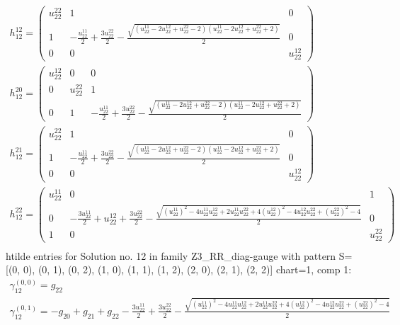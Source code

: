 \documentclass[a4paper, 11pt, twoside, onecolumn]{article}
\begin{document}
\begin{landscape}
\begin{gather*}
	 h_12^{12}=\begin{pmatrix}u^{22}_{22} & 1 & 0\\1 & - \frac{u^{11}_{22}}{2} + \frac{3 u^{22}_{22}}{2} - \frac{\sqrt{\left(u^{11}_{22} - 2 u^{12}_{22} + u^{22}_{22} - 2\right) \left(u^{11}_{22} - 2 u^{12}_{22} + u^{22}_{22} + 2\right)}}{2} & 0\\0 & 0 & u^{12}_{22}\end{pmatrix}\\ 
	 h_12^{20}=\begin{pmatrix}u^{12}_{22} & 0 & 0\\0 & u^{22}_{22} & 1\\0 & 1 & - \frac{u^{11}_{22}}{2} + \frac{3 u^{22}_{22}}{2} - \frac{\sqrt{\left(u^{11}_{22} - 2 u^{12}_{22} + u^{22}_{22} - 2\right) \left(u^{11}_{22} - 2 u^{12}_{22} + u^{22}_{22} + 2\right)}}{2}\end{pmatrix}\\ 
	 h_12^{21}=\begin{pmatrix}u^{22}_{22} & 1 & 0\\1 & - \frac{u^{11}_{22}}{2} + \frac{3 u^{22}_{22}}{2} - \frac{\sqrt{\left(u^{11}_{22} - 2 u^{12}_{22} + u^{22}_{22} - 2\right) \left(u^{11}_{22} - 2 u^{12}_{22} + u^{22}_{22} + 2\right)}}{2} & 0\\0 & 0 & u^{12}_{22}\end{pmatrix}\\ 
	 h_12^{22}=\begin{pmatrix}u^{11}_{22} & 0 & 1\\0 & - \frac{3 u^{11}_{22}}{2} + u^{12}_{22} + \frac{3 u^{22}_{22}}{2} - \frac{\sqrt{\left(u^{11}_{22}\right)^{2} - 4 u^{11}_{22} u^{12}_{22} + 2 u^{11}_{22} u^{22}_{22} + 4 \left(u^{12}_{22}\right)^{2} - 4 u^{12}_{22} u^{22}_{22} + \left(u^{22}_{22}\right)^{2} - 4}}{2} & 0\\1 & 0 & u^{22}_{22}\end{pmatrix}\\ 
\end{gather*} 
htilde entries for Solution no. 12 in family Z3_RR_diag-gauge with pattern S=[(0, 0), (0, 1), (0, 2), (1, 0), (1, 1), (1, 2), (2, 0), (2, 1), (2, 2)] chart=1, comp 1: 
\begin{gather*} 
	 \gamma^{(0, 0)}_12=g_{22}\\ 
	 \gamma^{(0, 1)}_12=- g_{20} + g_{21} + g_{22} - \frac{3 u^{11}_{22}}{2} + \frac{3 u^{22}_{22}}{2} - \frac{\sqrt{\left(u^{11}_{22}\right)^{2} - 4 u^{11}_{22} u^{12}_{22} + 2 u^{11}_{22} u^{22}_{22} + 4 \left(u^{12}_{22}\right)^{2} - 4 u^{12}_{22} u^{22}_{22} + \left(u^{22}_{22}\right)^{2} - 4}}{2}\\ 

\end{gather*}
\end{landscape}
\end{document}
